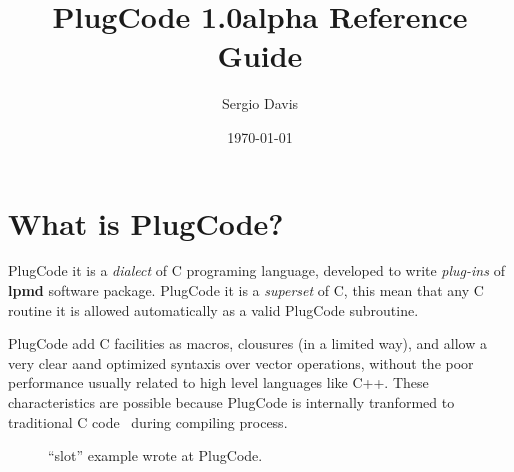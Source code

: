 \documentclass[a4paper,12pt]{article}
\begin{document}
\lstset{basicstyle=\small\ttfamily}
\lstset{showstringspaces=false}
\lstset{captionpos=b}

\title{PlugCode 1.0alpha Reference Guide}
\author{Sergio Davis}
\date{\today}

\maketitle

\section{What is PlugCode?}

PlugCode it is a \textit{dialect} of C programing language, developed to write
\textit{plug-ins} of \textbf{lpmd} software package. PlugCode it is a
\emph{superset}  of C, this mean that any C routine it is allowed
automatically as a valid PlugCode subroutine.

PlugCode add C facilities as macros, clousures (in a limited way), and allow a
very clear aand optimized syntaxis over vector operations, without the poor
performance usually related to high level languages like C++. These
characteristics are possible because PlugCode is internally tranformed to
traditional C code\footnotemark ~ during compiling process.


\begin{figure}[ht]\centering{}
\caption{``slot'' example wrote at PlugCode.}
\label{fig_code_slot}
\end{figure}
\end{document}
